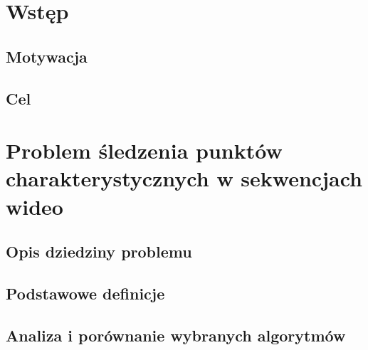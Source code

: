 \chapter{Wstęp}\label{Chapter_Wstep}

\section{Motywacja}\label{Section_Motywacja}

\section{Cel}\label{Section_Cel}

\chapter{Problem śledzenia punktów charakterystycznych w sekwencjach wideo}

\section{Opis dziedziny problemu}\label{Section_Problematyka}
\cite{HandTrackingVitterbi05}
\cite{TrackingClusteringGpu10}
\cite{SalientPointsTracking05}

\section{Podstawowe definicje}\label{Section_Definicje}
\cite{SalientPointsTracking05}

\section{Analiza i porównanie wybranych algorytmów}\label{Section_Algorytmy}

\subsection{}\label{Subsection_}
\cite{SalientPointsTracking05}

\subsection{}\label{Subsection_}
\cite{OpticalFlowNonPriori05}

\subsection{}\label{Subsection_}
\cite{HandTrackingVitterbi05}

